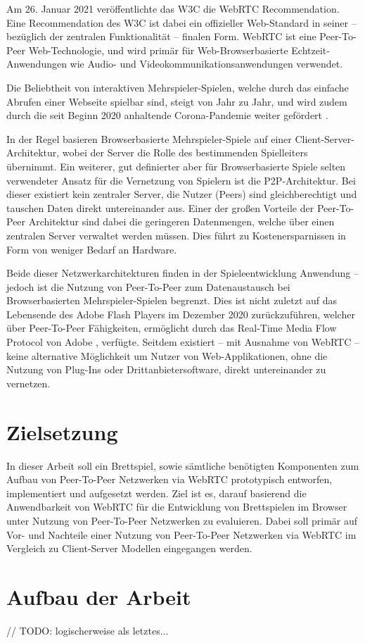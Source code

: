 Am 26. Januar 2021 veröffentlichte das \ac{W3C} die \ac{WebRTC} Recommendation. Eine Recommendation des \acs{W3C} ist dabei ein offizieller Web-Standard in seiner -- bezüglich der zentralen Funktionalität -- finalen Form. \acs{WebRTC} ist eine Peer-To-Peer Web-Technologie, und wird primär für Web-Browserbasierte Echtzeit-Anwendungen wie Audio- und Videokommunikationsanwendungen verwendet.\par

Die Beliebtheit von interaktiven Mehrspieler-Spielen, welche durch das einfache Abrufen einer Webseite spielbar sind, steigt von Jahr zu Jahr, und wird zudem durch die seit Beginn 2020 anhaltende Corona-Pandemie weiter gefördert \cite{BGMarket}.\par

In der Regel basieren Browserbasierte Mehrspieler-Spiele auf einer Client-Server-Architektur, wobei der Server die Rolle des bestimmenden Spielleiters übernimmt. Ein weiterer, gut definierter aber für Browserbasierte Spiele selten verwendeter Ansatz für die Vernetzung von Spielern ist die \acf{P2P}-Architektur. Bei dieser existiert kein zentraler Server, die Nutzer (Peers) sind gleichberechtigt und tauschen Daten direkt untereinander aus. Einer der großen Vorteile der Peer-To-Peer Architektur sind dabei die geringeren Datenmengen, welche über einen zentralen Server verwaltet werden müssen. Dies führt zu Kostenersparnissen in Form von weniger Bedarf an Hardware.\par

Beide dieser Netzwerkarchitekturen finden in der Spieleentwicklung Anwendung -- jedoch ist die Nutzung von Peer-To-Peer zum Datenaustausch bei Browserbasierten Mehrspieler-Spielen begrenzt. Dies ist nicht zuletzt auf das Lebensende des Adobe Flash Players im Dezember 2020 zurückzuführen, welcher über Peer-To-Peer Fähigkeiten, ermöglicht durch das Real-Time Media Flow Protocol von Adobe \cite{adobeRFC}, verfügte. Seitdem existiert -- mit Ausnahme von \acs{WebRTC} -- keine alternative Möglichkeit um Nutzer von Web-Applikationen, ohne die Nutzung von Plug-Ins oder Drittanbietersoftware, direkt untereinander zu vernetzen.\par

\section{Zielsetzung}
In dieser Arbeit soll ein Brettspiel, sowie sämtliche benötigten Komponenten zum Aufbau von Peer-To-Peer Netzwerken via \acs{WebRTC} prototypisch entworfen, implementiert und aufgesetzt werden. Ziel ist es, darauf basierend die Anwendbarkeit von \acs{WebRTC} für die Entwicklung von Brettspielen im Browser unter Nutzung von Peer-To-Peer Netzwerken zu evaluieren. Dabei soll primär auf Vor- und Nachteile einer Nutzung von Peer-To-Peer Netzwerken via \acs{WebRTC} im Vergleich zu Client-Server Modellen eingegangen werden.

\section{Aufbau der Arbeit}
// TODO: logischerweise als letztes...
